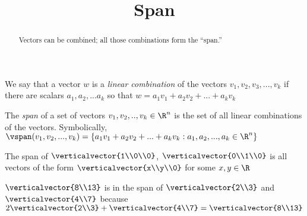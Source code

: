 \documentclass{ximera}
\title{Span}
\begin{document}
\begin{abstract}
  Vectors can be combined; all those combinations form the ``span.''
\end{abstract}

\begin{definition}
  We say that a vector $w$ is a \textit{linear combination} of the vectors $v_1,v_2,v_3,...,v_k$ if there are scalars $a_1,a_2,...a_k$ 
  so that $w = a_1v_1+a_2v_2+...+a_kv_k$
\end{definition}
  		
\begin{definition}
  The \textit{span} of a set of vectors $v_1,v_2, ..,v_k \in \R^n$ is the set of all linear combinations of the vectors.
  Symbolically, $\vspan(v_1,v_2,...,v_k) = \{ a_1v_1+a_2v_2+...+a_kv_k : a_1,a_2, ...,a_k \in \R^n\}$
\end{definition}

\begin{example}
  The span of $\verticalvector{1\\0\\0}$, $\verticalvector{0\\1\\0}$ is all vectors of the form $\verticalvector{x\\y\\0}$ for some $x,y \in \R$
\end{example}

\begin{example}
  $\verticalvector{8\\13}$ is in the span of $\verticalvector{2\\3}$ and $\verticalvector{4\\7}$ because
  $2\verticalvector{2\\3} + \verticalvector{4\\7} = \verticalvector{8\\13}$ 
\end{example}
\end{document}

